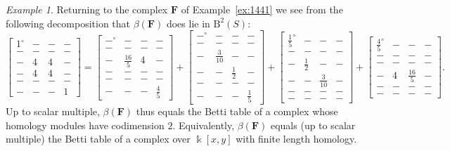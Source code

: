 \documentclass[12pt]{amsart}
\theoremstyle{definition}
\theoremstyle{remark}
\newtheorem{example}[lemma]{Example}
\newcommand{\kk}{\Bbbk}
\newcommand{\FF}{\mathbf{F}}
\newcommand{\zp}{\circ}
\newcommand{\BBQ}{\mathrm{B}}
\begin{document}
\begin{example}\label{ex:1441bis}
Returning to the complex $\FF$ of Example~\ref{ex:1441}
we see from the following decomposition that $\beta(\FF)$ does lie in $\BBQ^2(S)$:
\[
\begin{bmatrix} 1^\zp&-&-&-\\ -&-&-&-\\-&4&4&-\\-&4&4&-\\-&-&-&-\\-&-&-&1 \end{bmatrix}
=
\begin{bmatrix} -^\zp&-&-&-\\ -&-&-&-\\-&\frac{16}{5}&4&-\\-&-&-&-\\-&-&-&-\\-&-&-&\frac{4}{5} \end{bmatrix}
+
\begin{bmatrix} -^\zp&-&-&-\\ -&-&-&-\\-&\frac{3}{10}&-&-\\-&-&\frac{1}{2}&-\\-&-&-&-\\-&-&-&\frac{1}{5} \end{bmatrix}
+
\begin{bmatrix} \frac{1}{5}^\zp&-&-&-\\ -&-&-&-\\-&\frac{1}{2}&-&-\\-&-&\frac{3}{10}&-\\-&-&-&-\\-&-&-&- \end{bmatrix}
+
\begin{bmatrix} \frac{4}{5}^\zp&-&-&-\\ -&-&-&-\\-&-&-&-\\-&4&\frac{16}{5}&-\\-&-&-&-\\-&-&-&- \end{bmatrix}.
\]
Up to scalar multiple, $\beta(\FF)$ thus equals the Betti table of a complex whose homology modules have codimension $2$.  Equivalently, $\beta(\FF)$ 
equals (up to scalar multiple) the Betti table of a complex over $\kk[x,y]$ with finite length homology.
\end{example}
\end{document}

